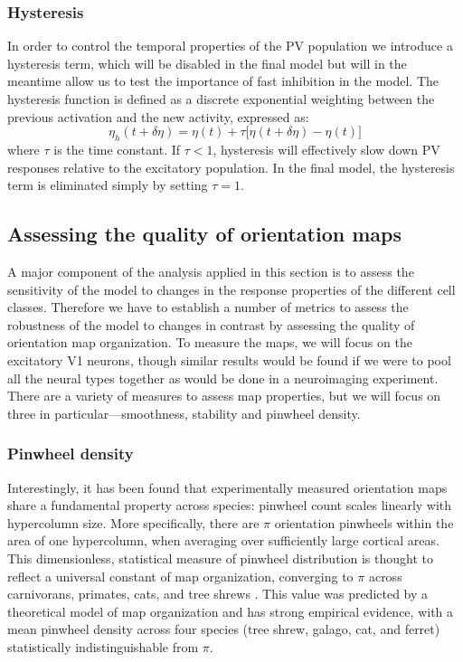 \subsubsection{Hysteresis}

In order to control the temporal properties of the PV population we
introduce a hysteresis term, which will be disabled in the final
model but will in the meantime allow us to test the importance of fast
inhibition in the model. The hysteresis function is defined as a discrete
exponential weighting between the previous activation and the new
activity, expressed as:
\begin{equation}
  \eta_h (t + \delta\eta) = \eta(t) + \tau \big[ \eta(t+\delta\eta) - \eta(t) \big]
\end{equation}
where $\tau$ is the time constant. If $\tau < 1$, hysteresis will
effectively slow down PV responses relative to the excitatory
population. In the final model, the hysteresis term is eliminated simply by
setting $\tau = 1$.

\subsection{Assessing the quality of orientation maps} \label{metrics}

A major component of the analysis applied in this section is to assess
the sensitivity of the model to changes in the response properties of
the different cell classes. Therefore we have to establish a number of
metrics to assess the robustness of the model to changes in contrast
by assessing the quality of orientation map organization.  To measure
the maps, we will focus on the excitatory V1 neurons, though similar
results would be found if we were to pool all the neural types
together as would be done in a neuroimaging experiment.
There are a variety of measures to assess map properties, but we will
focus on three in particular---smoothness, stability and pinwheel density.

\subsubsection{Pinwheel density}

Interestingly, it has been found that experimentally measured
orientation maps share a fundamental property across species: pinwheel
count scales linearly with hypercolumn size.  More specifically,
there are $\pi$ orientation pinwheels within the area of one
hypercolumn, when averaging over sufficiently large cortical
areas. This dimensionless, statistical measure of pinwheel
distribution is thought to reflect a universal constant of map
organization, converging to $\pi$ across carnivorans, primates, cats, and
tree shrews \citep{Kaschube2010, Keil2012}. This value was predicted
by a theoretical model of map organization and has strong empirical
evidence, with a mean pinwheel density across four species (tree
shrew, galago, cat, and ferret) statistically indistinguishable from
$\pi$.

